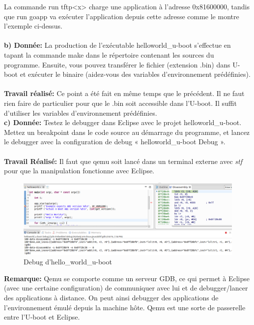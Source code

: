 La commande run tftp<x> charge une application à l'adresse 0x81600000, tandis que run goapp va exécuter l'application depuis cette adresse comme le montre l'exemple ci-dessus.\\\\
\textbf{b) Donnée: }La production de l'exécutable helloworld\_u-boot s'effectue en tapant la commande make dans le
répertoire contenant les sources du programme. Ensuite, vous pouvez transférer le fichier (extension
.bin) dans U-boot et exécuter le binaire (aidez-vous des variables d'environnement prédéfinies). \\\\
\textbf{Travail réalisé: } Ce point a été fait en même temps que le précédent. Il ne faut rien faire de particulier pour que le .bin soit accessible dans l'U-boot. Il suffit d'utiliser les variables d'environnement prédéfinies.\\

\textbf{c) Donnée: } Testez le debugger dans Eclipse avec le projet helloworld\_u-boot. Mettez un breakpoint dans le
code source au démarrage du programme, et lancez le debugger avec la configuration de debug
« helloworld\_u-boot Debug ». \\\\
\textbf{Travail Réalisé: } Il faut que qemu soit lancé dans un terminal externe avec \textit{stf} pour que la manipulation fonctionne avec Eclipse.
\begin{figure}[H]
	\begin{center}
		\includegraphics[width=18cm]{img/ubootCommand2.png}
		\caption{Debug d'hello\_world\_u-boot}
		\label{ubootComm2}
	\end{center}
\end{figure}
\textbf{Remarque: }Qemu se comporte comme un serveur GDB, ce qui permet à Eclipse (avec une certaine configuration) de communiquer avec lui et de debugger/lancer des applications à distance. On peut ainsi debugger des applications de l'environnement émulé depuis la machine hôte. Qemu est une sorte de passerelle entre l'U-boot et Eclipse.
